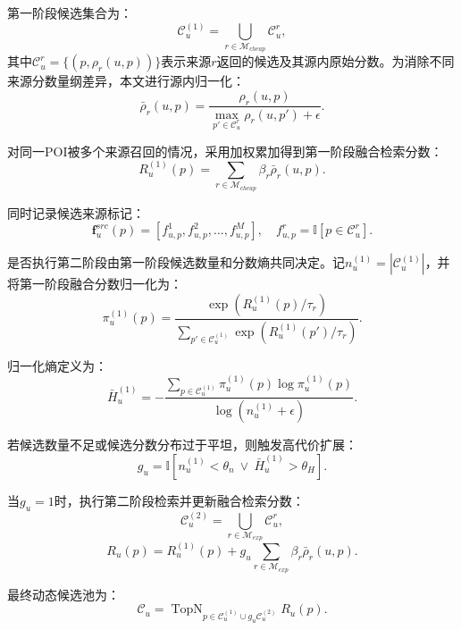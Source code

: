 \documentclass{rjthesis}
\begin{document}
第一阶段候选集合为：
\begin{equation}
\mathcal C_u^{(1)}=\bigcup_{r\in\mathcal M_{cheap}}\mathcal C_u^r,
\end{equation}
其中$\mathcal C_u^r=\{(p,\rho_r(u,p))\}$表示来源$r$返回的候选及其源内原始分数。为消除不同来源分数量纲差异，本文进行源内归一化：
\begin{equation}
\bar\rho_r(u,p)=\frac{\rho_r(u,p)}{\max_{p'\in\mathcal C_u^r}\rho_r(u,p')+\epsilon}.
\end{equation}

对同一POI被多个来源召回的情况，采用加权累加得到第一阶段融合检索分数：
\begin{equation}
R_u^{(1)}(p)=\sum_{r\in\mathcal M_{cheap}}\beta_r\bar\rho_r(u,p).
\end{equation}

同时记录候选来源标记：
\begin{equation}
\mathbf f_u^{src}(p)=[f_{u,p}^{1},f_{u,p}^{2},\ldots,f_{u,p}^{M}],\quad
f_{u,p}^{r}=\mathbb I[p\in\mathcal C_u^r].
\end{equation}

是否执行第二阶段由第一阶段候选数量和分数熵共同决定。记$n_u^{(1)}=|\mathcal C_u^{(1)}|$，并将第一阶段融合分数归一化为：
\begin{equation}
\pi_u^{(1)}(p)=\frac{\exp(R_u^{(1)}(p)/\tau_r)}{\sum_{p'\in\mathcal C_u^{(1)}}\exp(R_u^{(1)}(p')/\tau_r)}.
\end{equation}

归一化熵定义为：
\begin{equation}
\bar H_u^{(1)}=-\frac{\sum_{p\in\mathcal C_u^{(1)}}\pi_u^{(1)}(p)\log \pi_u^{(1)}(p)}{\log(n_u^{(1)}+\epsilon)}.
\end{equation}

若候选数量不足或候选分数分布过于平坦，则触发高代价扩展：
\begin{equation}
g_u=\mathbb I[n_u^{(1)}<\theta_n\ \lor\ \bar H_u^{(1)}>\theta_H].
\end{equation}

当$g_u=1$时，执行第二阶段检索并更新融合检索分数：
\begin{equation}
\mathcal C_u^{(2)}=\bigcup_{r\in\mathcal M_{exp}}\mathcal C_u^r,
\end{equation}
\begin{equation}
R_u(p)=R_u^{(1)}(p)+g_u\sum_{r\in\mathcal M_{exp}}\beta_r\bar\rho_r(u,p).
\end{equation}

最终动态候选池为：
\begin{equation}
\mathcal C_u=\operatorname{TopN}_{p\in \mathcal C_u^{(1)}\cup g_u\mathcal C_u^{(2)}}R_u(p).
\end{equation}
\end{document}
